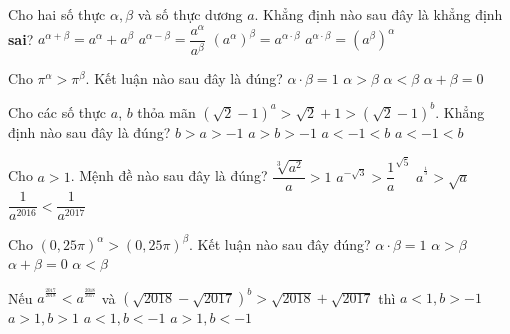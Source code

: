 \begin{ex}%
	Cho hai số thực $\alpha, \beta $ và số thực dương $a$. Khẳng định nào sau đây là khẳng định \textbf{sai}?
	\choice
	{\True $a^{\alpha +\beta}=a^{\alpha}+a^{\beta}$}
	{$a^{\alpha -\beta}=\dfrac{a^{\alpha}}{a^{\beta}}$}
	{$\left(a^{\alpha}\right)^{\beta}=a^{\alpha\cdot\beta}$}
	{$a^{\alpha\cdot\beta}=\left(a^{\beta}\right)^{\alpha}$}
\end{ex}
\begin{ex}%
	Cho $\pi^{\alpha}>\pi^{\beta}$. Kết luận nào sau đây là đúng?
	\choice
	{$\alpha \cdot \beta = 1$}
	{\True $\alpha > \beta$}
	{$\alpha < \beta$}
	{$\alpha + \beta = 0$}
\end{ex}
\begin{ex}%
	Cho các số thực $a$, $b$ thỏa mãn $\left(\sqrt{2}-1\right)^a>\sqrt{2}+1>\left(\sqrt{2}-1\right)^b$. Khẳng định nào sau đây là đúng?
	\choice
	{$b>a>-1$}
	{$a>b>-1$}
	{\True $a<-1<b$}
	{$a<-1<b$}
\end{ex}
\begin{ex}%
	Cho $a>1$. Mệnh đề nào sau đây là đúng?
	\choice
	{$\dfrac{\sqrt[3]{a^2}}{a}>1$}
	{\True ${a}^{-\sqrt{3}}>\dfrac{1}{a}^{\sqrt{5}}$}
	{${a}^{^{\tfrac{1}{3}}}>\sqrt{a}$}
	{$\dfrac{1}{a^{2016}}<\dfrac{1}{a^{2017}}$}
\end{ex}
\begin{ex}%
	Cho $\left(0{,}25\pi\right)^{\alpha}>\left(0{,}25\pi\right)^{\beta}$. Kết luận nào sau đây đúng?
	\choice
	{$\alpha\cdot \beta=1$}
	{$\alpha>\beta$}
	{$\alpha+\beta=0$}
	{\True $\alpha<\beta$}
\end{ex}
\begin{ex}%
	Nếu $a^{^{\tfrac{2017}{2018}}}<a^{^{\tfrac{2018}{2017}}}$ và $\left(\sqrt{2018}-\sqrt{2017}\right)^b>\sqrt{2018}+\sqrt{2017}$ thì
	\choice
	{$a<1,b>-1$}
	{$a>1,b>1$}
	{$a<1,b<-1$}
	{\True $a>1,b<-1$}
\end{ex}
